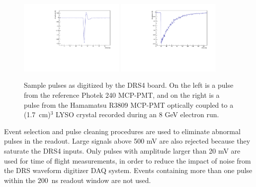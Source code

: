 \documentclass[12pt]{article}
\begin{document}
\begin{figure}[h] \centering
\includegraphics[width=0.45\textwidth]{figs/RefPulse} 
\includegraphics[width=0.45\textwidth]{figs/run064_event506} 
\caption{Sample pulses as digitized by the DRS4 board. 
On the left is a  pulse from the reference Photek 240 MCP-PMT, 
and on the right is a pulse from the Hamamatsu R3809 MCP-PMT
optically coupled to a (1.7~cm)$^{3}$ LYSO crystal 
recorded during an 8 GeV electron run.} 
\label{fig:PulseShapes}
\end{figure}

Event selection and pulse cleaning procedures are used to eliminate abnormal
pulses in the readout. Large signals above 500 mV are also rejected because they
saturate the DRS4 inputs. Only pulses with amplitude larger than 20 mV are used
for time of flight measurements, in order to reduce the impact of noise from the
DRS waveform digitizer DAQ system. Events containing more than one pulse within
the $200$~ns readout window are not used. 
\end{document}
